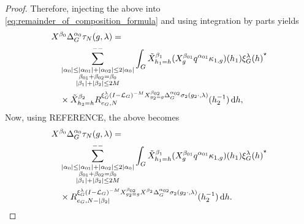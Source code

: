 \begin{proof}
    Therefore,
    injecting the above into \eqref{eq:remainder_of_composition_formula} and using integration by parts yields
    \begin{align*}
        &\LeftDifferentialOperator {\beta_0} \DifferenceOperatorOrder {\alpha_0} \tau_N(g, \lambda) =\\
        &\quad \lcsum{%
            \substack{%
                \abs{\alpha_0} \leq \abs{\alpha_{01}} + \abs{\alpha_{02}} \leq 2 \abs{\alpha_0}\\
                \beta_{01} + \beta_{02} = \beta_0\\
                \abs {\beta_1} + \abs {\beta_2} \leq 2 M
            }
        }
        \int_\Group \RightDifferentialOperator[h_1 = h] {\beta_1} (\LeftDifferentialOperator [g] {\beta_{01}} q^{\alpha_{01}} \kappa_{1, g})(h_1) \adj {\Rep \lambda(h)}\\
        &\quad \times
        \RightDifferentialOperator[h_2 = h] {\beta_2} \TaylorRemainder {\Rep \lambda \BesselPotentialSquared {-M} \LeftDifferentialOperator [g_2 = g] {\beta_{02}} \DifferenceOperatorOrder {\alpha_{02}} \sigma_2(g_2 \dummy, \lambda)} {e_\Group} N (h_2^{-1}) \dd h,
    \end{align*}
    Now, using REFERENCE, %
    the above becomes
    \begin{align*}
        &\LeftDifferentialOperator {\beta_0} \DifferenceOperatorOrder {\alpha_0} \tau_N(g, \lambda) =\\
        &\quad \lcsum{%
            \substack{%
                \abs{\alpha_0} \leq \abs{\alpha_{01}} + \abs{\alpha_{02}} \leq 2 \abs{\alpha_0}\\
                \beta_{01} + \beta_{02} = \beta_0\\
                \abs {\beta_1} + \abs {\beta_2} \leq 2 M
            }
        }
        \int_\Group \RightDifferentialOperator[h_1 = h] {\beta_1} (\LeftDifferentialOperator [g] {\beta_{01}} q^{\alpha_{01}} \kappa_{1, g})(h_1) \adj {\Rep \lambda(h)}\\
        &\quad \times
        \TaylorRemainder {\Rep \lambda \BesselPotentialSquared {-M} \LeftDifferentialOperator [g_2 = g] {\beta_{02}} \LeftDifferentialOperator {\beta_2} \DifferenceOperatorOrder {\alpha_{02}} \sigma_2(g_2 \dummy, \lambda)} {e_\Group} {N - \abs {\beta_2}} (h_2^{-1}) \dd h.
    \end{align*}


\end{proof}
